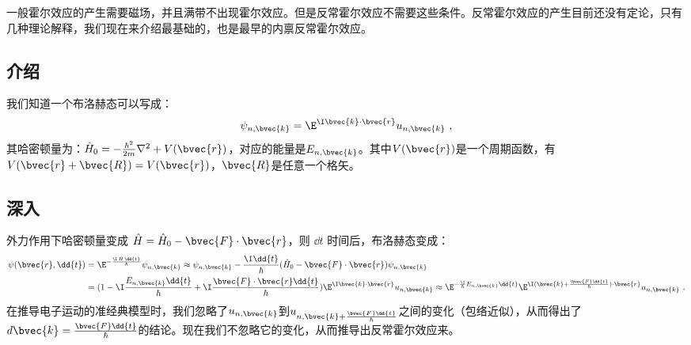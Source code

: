 
一般霍尔效应的产生需要磁场，并且满带不出现霍尔效应。但是反常霍尔效应不需要这些条件。反常霍尔效应的产生目前还没有定论，只有几种理论解释，我们现在来介绍最基础的，也是最早的内禀反常霍尔效应。
\subsection{介绍}
我们知道一个布洛赫态可以写成：
\begin{equation}
\psi_{n,\bvec{k}}=\E^{\I\bvec{k}\cdot\bvec{r}}u_{n,\bvec{k}}~,
\end{equation}
其哈密顿量为：$\hat H_0=-\frac{\hbar^2}{2m}\nabla^2+V(\bvec{r})$，对应的能量是$E_{n,\bvec{k}}$。其中$V(\bvec{r})$是一个周期函数，有$V(\bvec{r}+\bvec{R})=V(\bvec{r})$，$\bvec{R}$是任意一个格矢。

\subsection{深入}
外力作用下哈密顿量变成 $\hat H =\hat H_0 -\bvec{F}\cdot\bvec{r}$，则 $\dd{t}$ 时间后，布洛赫态变成：
\begin{equation}
\begin{aligned}
\psi(\bvec{r},\dd{t})&=\E^{-\frac{\I\,\hat H\,\dd{t}}{\hbar}}\psi_{n,\bvec{k}} \approx \psi_{n,\bvec{k}}-\frac{\I\dd{t}}{\hbar}(\hat H_0 -\bvec{F}\cdot\bvec{r})\psi_{n,\bvec{k}}\\
&=(1-\I \frac{E_{n,\bvec{k}}\dd{t}}{\hbar}+\I\frac{\bvec{F}\cdot\bvec{r}\dd{t}}{\hbar})\E^{\I\bvec{k}\cdot\bvec{r}}u_{n,\bvec{k}}
\approx \E^{-\frac{\I}{\hbar}E_{n,\bvec{k}}\dd{t}}\E^{\I(\bvec{k}+\frac{\bvec{F}\dd{t}}{\hbar})\cdot \bvec{r}}u_{n,\bvec{k}}~.
\end{aligned}
\end{equation}
在推导电子运动的准经典模型时，我们忽略了$u_{n,\bvec{k}}$到$u_{n,\bvec{k}+\frac{\bvec{F}\dd{t}}{\hbar}}$之间的变化（包络近似），从而得出了$d\bvec{k}=\frac{\bvec{F}\dd{t}}{\hbar}$的结论。现在我们不忽略它的变化，从而推导出反常霍尔效应来。

